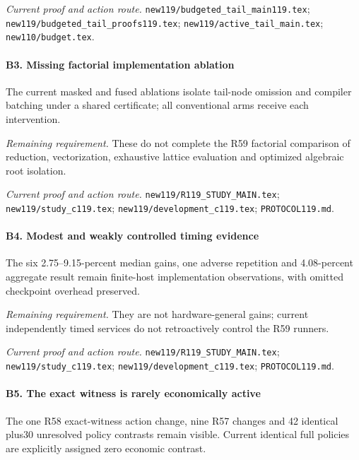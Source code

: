 \par\emph{Current proof and action route.} \nolinkurl{new119/budgeted_tail_main119.tex}; \nolinkurl{new119/budgeted_tail_proofs119.tex}; \nolinkurl{new119/active_tail_main.tex}; \nolinkurl{new110/budget.tex}.

\paragraph{B3. Missing factorial implementation ablation}

The current masked and fused ablations isolate tail-node omission and compiler batching under a shared certificate; all conventional arms receive each intervention.

\par\emph{Remaining requirement.} These do not complete the R59 factorial comparison of reduction, vectorization, exhaustive lattice evaluation and optimized algebraic root isolation.

\par\emph{Current proof and action route.} \nolinkurl{new119/R119_STUDY_MAIN.tex}; \nolinkurl{new119/study_c119.tex}; \nolinkurl{new119/development_c119.tex}; \nolinkurl{PROTOCOL119.md}.

\paragraph{B4. Modest and weakly controlled timing evidence}

The six 2.75--9.15-percent median gains, one adverse repetition and 4.08-percent aggregate result remain finite-host implementation observations, with omitted checkpoint overhead preserved.

\par\emph{Remaining requirement.} They are not hardware-general gains; current independently timed services do not retroactively control the R59 runners.

\par\emph{Current proof and action route.} \nolinkurl{new119/R119_STUDY_MAIN.tex}; \nolinkurl{new119/study_c119.tex}; \nolinkurl{new119/development_c119.tex}; \nolinkurl{PROTOCOL119.md}.

\paragraph{B5. The exact witness is rarely economically active}

The one R58 exact-witness action change, nine R57 changes and 42 identical plus30 unresolved policy contrasts remain visible. Current identical full policies are explicitly assigned zero economic contrast.

